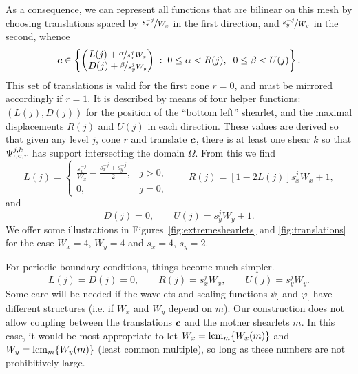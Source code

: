As a consequence, we can represent all functions that are bilinear on this mesh by choosing translations
spaced by $\nicefrac{s_x^{-j}}{W_x}$ in the first direction, and $\nicefrac{s_y^{-j}}{W_y}$ in the second,
whence
\[
    {\bm c} \in \left\{\begin{pmatrix}
                    L(j) + \nicefrac{\alpha}{s_x^jW_x} \\ 
                    D(j) + \nicefrac{\beta}{s_y^jW_y}
                 \end{pmatrix} \;:\;
          0 \leq \alpha < R(j), \;\; 0 \leq \beta < U(j) \right\}.
\]
This set of translations is valid for the first cone $r=0$, and must be mirrored accordingly if $r=1$. It is
described by means of four helper functions: $(L(j), D(j))$ for the position of the ``bottom left'' shearlet,
and the maximal displacements $R(j)$ and $U(j)$ in each direction. These values are derived so that given any
level $j$, cone $r$ and translate ${\bm c}$, there is at least one shear $k$ so that $\Psi_{\cdot,{\bm c},r}^{j,k}$
has support intersecting the domain $\Omega$. From this we find
\[ 
    L(j)=\begin{cases} \frac{s_x^{-j}}{W_x}-\frac{s_x^{-j} + s_y^{-j}}{2}, & j>0, \\ 0, & j=0, \end{cases}
    \qquad 
    R(j)=[1-2L(j)]s_x^jW_x+1,
\]
and
\[ 
    D(j) = 0,\qquad 
    U(j) = s_y^jW_y+1.
\]
We offer some illustrations in Figures~\ref{fig:extremeshearlets} and \ref{fig:translations} for the case
$W_x=4$, $W_y=4$ and $s_x=4$, $s_y=2$. 

For periodic boundary conditions, things become much simpler.
\[
    L(j) = D(j) = 0, \qquad R(j) = s_x^jW_x, \qquad U(j) = s_y^jW_y.
\]
Some care will be needed if the wavelets and scaling functions $\psi_\cdot$ and $\varphi_\cdot$ have different
structures (i.e. if $W_x$ and $W_y$ depend on $m$). Our construction does not allow coupling between the
translations ${\bm c}$ and the mother shearlets $m$. In this case, it would be most appropriate to let
$W_x=\operatorname{lcm}_m\{W_x(m)\}$ and $W_y=\operatorname{lcm}_m\{W_y(m)\}$ (least common multiple), so long as these numbers are not
prohibitively large.

